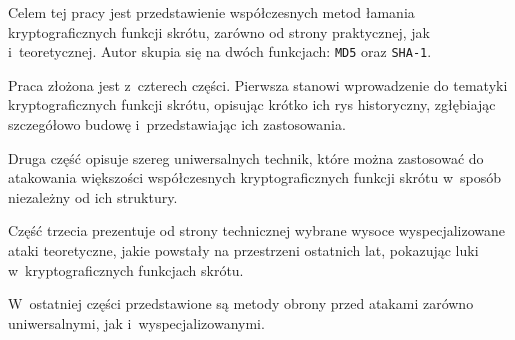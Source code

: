 Celem tej pracy jest przedstawienie współczesnych metod łamania
kryptograficznych funkcji skrótu, zarówno od strony praktycznej, jak
i~teoretycznej. Autor skupia się na dwóch funkcjach: \texttt{MD5} oraz
\texttt{SHA-1}.

Praca złożona jest z~czterech części. Pierwsza stanowi wprowadzenie do tematyki
kryptograficznych funkcji skrótu, opisując krótko ich rys historyczny,
zgłębiając szczegółowo budowę i~przedstawiając ich zastosowania.

Druga część opisuje szereg uniwersalnych technik, które można zastosować do
atakowania większości współczesnych kryptograficznych funkcji skrótu w~sposób
niezależny od ich struktury.

Część trzecia prezentuje od strony technicznej wybrane wysoce wyspecjalizowane
ataki teoretyczne, jakie powstały na przestrzeni ostatnich lat, pokazując luki
w~kryptograficznych funkcjach skrótu.

W~ostatniej części przedstawione są metody obrony przed atakami zarówno
uniwersalnymi, jak i~wyspecjalizowanymi.
